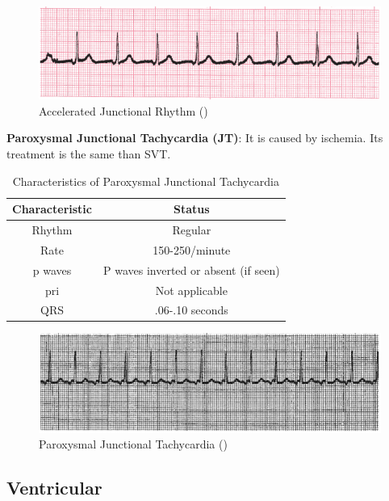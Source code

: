  \begin{figure}[H]
\centering
\includegraphics[scale=0.8]{img/AJR.png}
\caption{Accelerated Junctional Rhythm (\cite{arryth_types})}
\label{fig:AJR}
\end{figure}

\textbf{Paroxysmal Junctional Tachycardia (JT)}: It is caused by ischemia. Its treatment is the same than SVT.

\begin{table}[H]
\begin{center}
\begin{tabular}{||c || c||}
 \hline
\textbf{Characteristic} & \textbf{Status} \\ [0.4ex] 
 \hline\hline
 Rhythm & Regular \\
\hline
Rate & 150-250/minute \\
\hline
p waves & P waves inverted or absent (if seen) \\
\hline
pri & Not applicable \\
\hline
QRS & .06-.10 seconds \\
\hline\hline
\end{tabular}
\end{center}
\caption{Characteristics of Paroxysmal Junctional Tachycardia}
\label{table:JT_characteristics}
\end{table}

 \begin{figure}[H]
\centering
\includegraphics[scale=0.8]{img/JT.png}
\caption{Paroxysmal Junctional Tachycardia (\cite{arryth_types})}
\label{fig:JT}
\end{figure}


\subsection{Ventricular}

